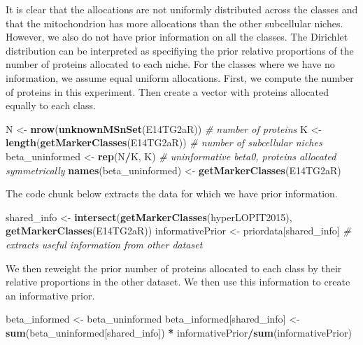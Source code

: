 \documentclass[
]{article}
\newenvironment{Shaded}{\begin{snugshade}}{\end{snugshade}}
\newcommand{\CommentTok}[1]{\textcolor[rgb]{0.56,0.35,0.01}{\textit{#1}}}
\newcommand{\KeywordTok}[1]{\textcolor[rgb]{0.13,0.29,0.53}{\textbf{#1}}}
\newcommand{\NormalTok}[1]{#1}
\newcommand{\OperatorTok}[1]{\textcolor[rgb]{0.81,0.36,0.00}{\textbf{#1}}}
\newcommand{\StringTok}[1]{\textcolor[rgb]{0.31,0.60,0.02}{#1}}
\begin{document}
It is clear that the allocations are not uniformly distributed across
the classes and that the mitochondrion has more allocations than the
other subcellular niches. However, we also do not have prior information
on all the classes. The Dirichlet distribution can be interpreted as
specifiying the prior relative proportions of the number of proteins
allocated to each niche. For the classes where we have no information,
we assume equal uniform allocations. First, we compute the number of
proteins in this experiment. Then create a vector with proteins
allocated equally to each class.

\begin{Shaded}
\begin{Highlighting}[]
\NormalTok{N <-}\StringTok{ }\KeywordTok{nrow}\NormalTok{(}\KeywordTok{unknownMSnSet}\NormalTok{(E14TG2aR)) }\CommentTok{# number of proteins}
\NormalTok{K <-}\StringTok{ }\KeywordTok{length}\NormalTok{(}\KeywordTok{getMarkerClasses}\NormalTok{(E14TG2aR)) }\CommentTok{# number of subcellular niches}
\NormalTok{beta_uninformed <-}\StringTok{ }\KeywordTok{rep}\NormalTok{(N}\OperatorTok{/}\NormalTok{K, K) }\CommentTok{# uninformative beta0, proteins allocated symmetrically}
\KeywordTok{names}\NormalTok{(beta_uninformed) <-}\StringTok{ }\KeywordTok{getMarkerClasses}\NormalTok{(E14TG2aR)}
\end{Highlighting}
\end{Shaded}

The code chunk below extracts the data for which we have prior
information.

\begin{Shaded}
\begin{Highlighting}[]
\NormalTok{shared_info <-}\StringTok{ }\KeywordTok{intersect}\NormalTok{(}\KeywordTok{getMarkerClasses}\NormalTok{(hyperLOPIT2015), }\KeywordTok{getMarkerClasses}\NormalTok{(E14TG2aR))}
\NormalTok{informativePrior <-}\StringTok{ }\NormalTok{priordata[shared_info] }\CommentTok{# extracts useful information from other dataset}
\end{Highlighting}
\end{Shaded}

We then reweight the prior number of proteins allocated to each class by
their relative proportions in the other dataset. We then use this
information to create an informative prior.

\begin{Shaded}
\begin{Highlighting}[]
\NormalTok{beta_informed <-}\StringTok{ }\NormalTok{beta_uninformed}
\NormalTok{beta_informed[shared_info] <-}\StringTok{ }\KeywordTok{sum}\NormalTok{(beta_uninformed[shared_info]) }\OperatorTok{*}\StringTok{ }\NormalTok{informativePrior}\OperatorTok{/}\KeywordTok{sum}\NormalTok{(informativePrior)}
\end{Highlighting}
\end{Shaded}
\end{document}
